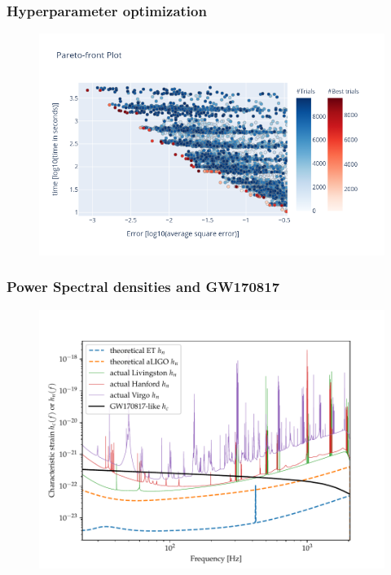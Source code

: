 \documentclass{beamer}
\begin{document}
\begin{frame}
    \frametitle{Hyperparameter optimization}
    \begin{figure}[ht]
    \centering
    \includegraphics[width=.95\textwidth]{figures/pareto-front}
    \label{fig:pareto-front-nonspinning}
    \end{figure}
\end{frame}

\begin{frame}
    \frametitle{Power Spectral densities and GW170817}
    \begin{figure}[ht]
    \centering
    \includegraphics[width=.91\textwidth]{figures/characteristic_strains}
    \label{fig:characteristic_strains}
    \end{figure}
\end{frame}
\end{document}
